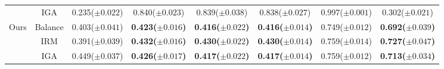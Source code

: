 \begin{table}[b]
{\begin{tabular}{|cc|cccc|||cc|}
\multicolumn{1}{|c}{}                        & IGA         & \multicolumn{1}{c}{0.235{\scriptsize($\pm 0.022$)}} & \multicolumn{1}{c|}{0.840{\scriptsize($\pm 0.023$)}} & \multicolumn{1}{c}{0.839{\scriptsize($\pm 0.038$)}} & 0.838{\scriptsize($\pm 0.027$)} & 0.997{\scriptsize($\pm 0.001$)} & 0.302{\scriptsize($\pm 0.021$)}\\ \cline{1-2}
\multicolumn{1}{|c}{\multirow{3}{*}{\large Ours}}   & Balance   & \multicolumn{1}{c}{0.403{\scriptsize($\pm 0.041$)}} & \multicolumn{1}{c|}{\bf 0.423{\scriptsize($\pm 0.016$)}} & \multicolumn{1}{c}{\bf 0.416{\scriptsize($\pm 0.022$)}} & \bf 0.416{\scriptsize($\pm 0.014$)} & 0.749{\scriptsize($\pm 0.012$)} & \bf 0.692{\scriptsize($\pm 0.039$)} \\ 
\multicolumn{1}{|c}{}                        & IRM        & \multicolumn{1}{c}{0.391{\scriptsize($\pm 0.039$)}} & \multicolumn{1}{c|}{\bf 0.432{\scriptsize($\pm 0.016$)}} & \multicolumn{1}{c}{\bf 0.430{\scriptsize($\pm 0.022$)}} &\bf 0.430{\scriptsize($\pm 0.014$)}  & 0.759{\scriptsize($\pm 0.014$)} & \bf 0.727{\scriptsize($\pm 0.047$)}\\
\multicolumn{1}{|c}{}                        & IGA        & \multicolumn{1}{c}{0.449{\scriptsize($\pm 0.037$)}} & \multicolumn{1}{c|}{\bf 0.426{\scriptsize($\pm 0.017$)}} & \multicolumn{1}{c}{\bf 0.417{\scriptsize($\pm 0.022$)}} &\bf 0.417{\scriptsize($\pm 0.014$)}  & 0.759{\scriptsize($\pm 0.012$)} & \bf  0.713{\scriptsize($\pm 0.034$)}\\ \hline
\end{tabular}
}
\end{table}






